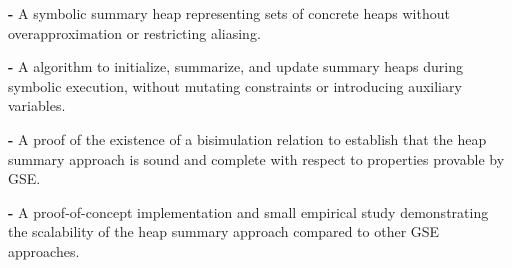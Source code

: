 


\begin{compactdesc}

\item\textbf{-} A symbolic summary heap representing
sets of concrete heaps without overapproximation or restricting aliasing.


\item\textbf{-} A algorithm to initialize, summarize, and
  update summary heaps during symbolic execution, without mutating 
  constraints or introducing auxiliary variables.

\item\textbf{-} A proof of the existence of a bisimulation relation to establish
  that the heap summary approach is sound and complete with respect to
  properties provable by GSE.

\item\textbf{-} A proof-of-concept implementation and small empirical study 
demonstrating the scalability of the heap summary approach
  compared to other GSE approaches.

\end{compactdesc}





